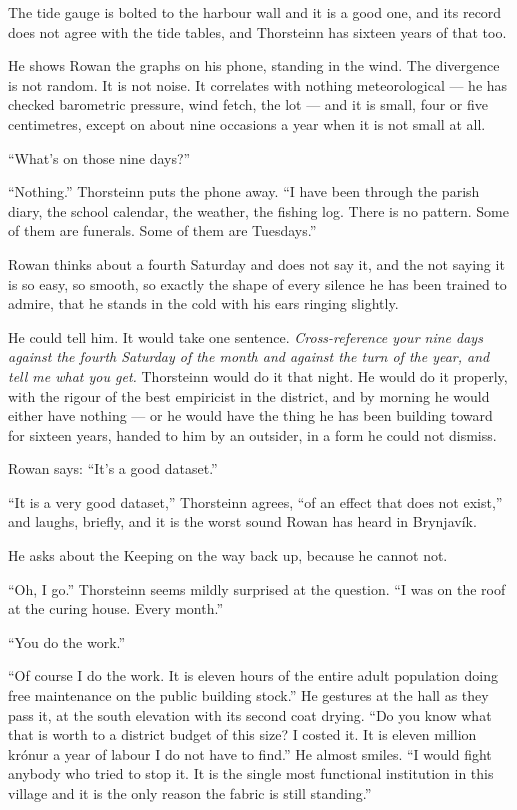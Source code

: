 \documentclass[11pt,oneside]{book}
\newcommand{\sceneline}{%
  \par\vspace{1.2em}
  \begin{center}
    \fontsize{11}{11}\selectfont \textbullet\quad\textbullet\quad\textbullet
  \end{center}
  \vspace{0.6em}\noindent\ignorespaces
}
\begin{document}
\sceneline

The tide gauge is bolted to the harbour wall and it is a good one, and
its record does not agree with the tide tables, and Thorsteinn has
sixteen years of that too.

He shows Rowan the graphs on his phone, standing in the wind. The
divergence is not random. It is not noise. It correlates with nothing
meteorological --- he has checked barometric pressure, wind fetch, the
lot --- and it is small, four or five centimetres, except on about nine
occasions a year when it is not small at all.

``What's on those nine days?''

``Nothing.'' Thorsteinn puts the phone away. ``I have been through the
parish diary, the school calendar, the weather, the fishing log. There
is no pattern. Some of them are funerals. Some of them are Tuesdays.''

Rowan thinks about a fourth Saturday and does not say it, and the not
saying it is so easy, so smooth, so exactly the shape of every silence
he has been trained to admire, that he stands in the cold with his ears
ringing slightly.

He could tell him. It would take one sentence. \emph{Cross-reference
your nine days against the fourth Saturday of the month and against the
turn of the year, and tell me what you get.} Thorsteinn would do it that
night. He would do it properly, with the rigour of the best empiricist
in the district, and by morning he would either have nothing --- or he
would have the thing he has been building toward for sixteen years,
handed to him by an outsider, in a form he could not dismiss.

Rowan says: ``It's a good dataset.''

``It is a very good dataset,'' Thorsteinn agrees, ``of an effect that
does not exist,'' and laughs, briefly, and it is the worst sound Rowan
has heard in Brynjavík.

\sceneline

He asks about the Keeping on the way back up, because he cannot not.

``Oh, I go.'' Thorsteinn seems mildly surprised at the question. ``I was
on the roof at the curing house. Every month.''

``You do the work.''

``Of course I do the work. It is eleven hours of the entire adult
population doing free maintenance on the public building stock.'' He
gestures at the hall as they pass it, at the south elevation with its
second coat drying. ``Do you know what that is worth to a district
budget of this size? I costed it. It is eleven million krónur a year of
labour I do not have to find.'' He almost smiles. ``I would fight
anybody who tried to stop it. It is the single most functional
institution in this village and it is the only reason the fabric is
still standing.''
\end{document}
